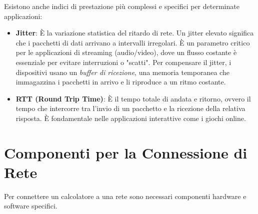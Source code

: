 Esistono anche indici di prestazione più complessi e specifici per determinate applicazioni:
\begin{itemize}
    \item \textbf{Jitter}: È la variazione statistica del ritardo di rete. Un jitter elevato significa che i pacchetti di dati arrivano a intervalli irregolari. È un parametro critico per le applicazioni di streaming (audio/video), dove un flusso costante è essenziale per evitare interruzioni o "scatti". Per compensare il jitter, i dispositivi usano un \textit{buffer di ricezione}, una memoria temporanea che immagazzina i pacchetti in arrivo e li riproduce a un ritmo costante.
    \item \textbf{RTT (Round Trip Time)}: È il tempo totale di andata e ritorno, ovvero il tempo che intercorre tra l'invio di un pacchetto e la ricezione della relativa risposta. È fondamentale nelle applicazioni interattive come i giochi online.
\end{itemize}


\section{Componenti per la Connessione di Rete}

Per connettere un calcolatore a una rete sono necessari componenti hardware e software specifici.

